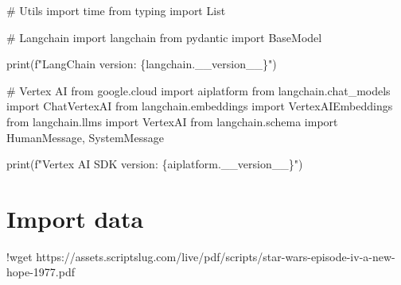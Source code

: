 \documentclass[
  letterpaper,
  DIV=11,
  numbers=noendperiod]{scrreprt}
\newenvironment{Shaded}{\begin{snugshade}}{\end{snugshade}}
\newcommand{\BuiltInTok}[1]{\textcolor[rgb]{0.00,0.23,0.31}{#1}}
\newcommand{\CommentTok}[1]{\textcolor[rgb]{0.37,0.37,0.37}{#1}}
\newcommand{\ErrorTok}[1]{\textcolor[rgb]{0.68,0.00,0.00}{#1}}
\newcommand{\FloatTok}[1]{\textcolor[rgb]{0.68,0.00,0.00}{#1}}
\newcommand{\ImportTok}[1]{\textcolor[rgb]{0.00,0.46,0.62}{#1}}
\newcommand{\NormalTok}[1]{\textcolor[rgb]{0.00,0.23,0.31}{#1}}
\newcommand{\OperatorTok}[1]{\textcolor[rgb]{0.37,0.37,0.37}{#1}}
\newcommand{\SpecialCharTok}[1]{\textcolor[rgb]{0.37,0.37,0.37}{#1}}
\newcommand{\SpecialStringTok}[1]{\textcolor[rgb]{0.13,0.47,0.30}{#1}}
\begin{document}
\begin{Shaded}
\begin{Highlighting}[]
\CommentTok{\# Utils}
\ImportTok{import}\NormalTok{ time}
\ImportTok{from}\NormalTok{ typing }\ImportTok{import}\NormalTok{ List}

\CommentTok{\# Langchain}
\ImportTok{import}\NormalTok{ langchain}
\ImportTok{from}\NormalTok{ pydantic }\ImportTok{import}\NormalTok{ BaseModel}

\BuiltInTok{print}\NormalTok{(}\SpecialStringTok{f"LangChain version: }\SpecialCharTok{\{}\NormalTok{langchain}\SpecialCharTok{.}\NormalTok{\_\_version\_\_}\SpecialCharTok{\}}\SpecialStringTok{"}\NormalTok{)}

\CommentTok{\# Vertex AI}
\ImportTok{from}\NormalTok{ google.cloud }\ImportTok{import}\NormalTok{ aiplatform}
\ImportTok{from}\NormalTok{ langchain.chat\_models }\ImportTok{import}\NormalTok{ ChatVertexAI}
\ImportTok{from}\NormalTok{ langchain.embeddings }\ImportTok{import}\NormalTok{ VertexAIEmbeddings}
\ImportTok{from}\NormalTok{ langchain.llms }\ImportTok{import}\NormalTok{ VertexAI}
\ImportTok{from}\NormalTok{ langchain.schema }\ImportTok{import}\NormalTok{ HumanMessage, SystemMessage}

\BuiltInTok{print}\NormalTok{(}\SpecialStringTok{f"Vertex AI SDK version: }\SpecialCharTok{\{}\NormalTok{aiplatform}\SpecialCharTok{.}\NormalTok{\_\_version\_\_}\SpecialCharTok{\}}\SpecialStringTok{"}\NormalTok{)}
\end{Highlighting}
\end{Shaded}


\hypertarget{import-data}{%
\chapter{Import data}\label{import-data}}

\begin{Shaded}
\begin{Highlighting}[]
\OperatorTok{!}\NormalTok{wget https:}\OperatorTok{//}\NormalTok{assets.scriptslug.com}\OperatorTok{/}\NormalTok{live}\OperatorTok{/}\NormalTok{pdf}\OperatorTok{/}\NormalTok{scripts}\OperatorTok{/}\NormalTok{star}\OperatorTok{{-}}\NormalTok{wars}\OperatorTok{{-}}\NormalTok{episode}\OperatorTok{{-}}\NormalTok{iv}\OperatorTok{{-}}\NormalTok{a}\OperatorTok{{-}}\NormalTok{new}\OperatorTok{{-}}\NormalTok{hope}\OperatorTok{{-}}\FloatTok{1977.}\ErrorTok{pdf}
\end{Highlighting}
\end{Shaded}
\end{document}
